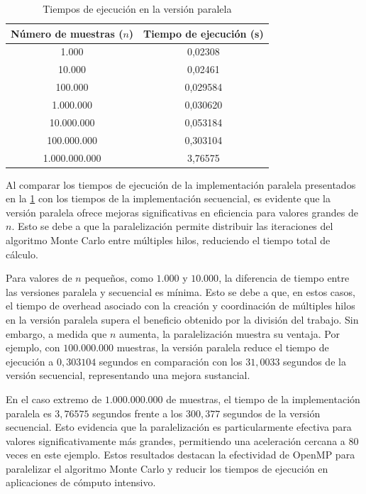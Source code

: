 \documentclass[a4paper, 10pt]{IEEEtran}
\begin{document}
\begin{table}[H]
	\centering
	\begin{tabular}{|c|c|}
		\hline
		\textbf{Número de muestras ($n$)} & \textbf{Tiempo de ejecución (s)} \\
		\hline
		1.000         & 0,02308 \\
		10.000        & 0,02461 \\
		100.000       & 0,029584 \\
		1.000.000     & 0,030620 \\
		10.000.000    & 0,053184 \\
		100.000.000   & 0,303104 \\
		1.000.000.000 & 3,76575 \\
		\hline
	\end{tabular}
	\caption{Tiempos de ejecución en la versión paralela}
	\label{tab:parallel_execution_times}
\end{table}

Al comparar los tiempos de ejecución de la implementación paralela presentados en la \cref{tab:parallel_execution_times} con los tiempos de la implementación secuencial, es evidente que la versión paralela ofrece mejoras significativas en eficiencia para valores grandes de $n$. Esto se debe a que la paralelización permite distribuir las iteraciones del algoritmo Monte Carlo entre múltiples hilos, reduciendo el tiempo total de cálculo.

Para valores de $n$ pequeños, como $1.000$ y $10.000$, la diferencia de tiempo entre las versiones paralela y secuencial es mínima. Esto se debe a que, en estos casos, el tiempo de overhead asociado con la creación y coordinación de múltiples hilos en la versión paralela supera el beneficio obtenido por la división del trabajo. Sin embargo, a medida que $n$ aumenta, la paralelización muestra su ventaja. Por ejemplo, con $100.000.000$ muestras, la versión paralela reduce el tiempo de ejecución a $0,303104$ segundos en comparación con los $31,0033$ segundos de la versión secuencial, representando una mejora sustancial.

En el caso extremo de $1.000.000.000$ de muestras, el tiempo de la implementación paralela es $3,76575$ segundos frente a los $300,377$ segundos de la versión secuencial. Esto evidencia que la paralelización es particularmente efectiva para valores significativamente más grandes, permitiendo una aceleración cercana a $80$ veces en este ejemplo. Estos resultados destacan la efectividad de OpenMP para paralelizar el algoritmo Monte Carlo y reducir los tiempos de ejecución en aplicaciones de cómputo intensivo.
\end{document}
